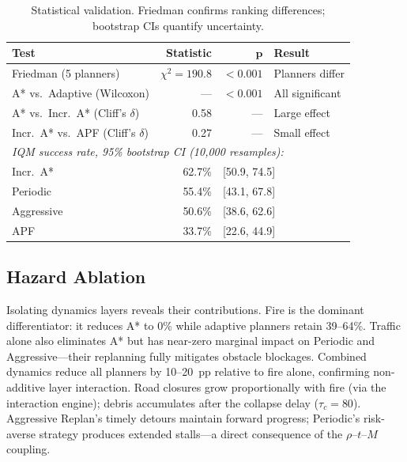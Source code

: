 \documentclass[drones,article,submit,moreauthors]{Definitions/mdpi}
\begin{document}
\begin{table}[!htb]
\centering
\caption{Statistical validation. Friedman confirms ranking differences;
  bootstrap CIs quantify uncertainty.}
\label{tab:stats_summary}
\begin{tabular}{lrrl}
\toprule
\textbf{Test} & \textbf{Statistic} & $\boldsymbol{p}$ & \textbf{Result} \\
\midrule
Friedman (5 planners) & $\chi^2{=}190.8$ & ${<}0.001$ & Planners differ \\
A* vs.\ Adaptive (Wilcoxon) & --- & ${<}0.001$ & All significant \\
A* vs.\ Incr.\ A* (Cliff's $\delta$) & 0.58 & --- & Large effect \\
Incr.\ A* vs.\ APF (Cliff's $\delta$) & 0.27 & --- & Small effect \\
\midrule
\multicolumn{4}{l}{\textit{IQM success rate, 95\% bootstrap CI (10,000 resamples):}} \\
Incr.\ A* & 62.7\% & \multicolumn{2}{l}{[50.9, 74.5]} \\
Periodic & 55.4\% & \multicolumn{2}{l}{[43.1, 67.8]} \\
Aggressive & 50.6\% & \multicolumn{2}{l}{[38.6, 62.6]} \\
APF & 33.7\% & \multicolumn{2}{l}{[22.6, 44.9]} \\
\bottomrule
\end{tabular}
\end{table}

\subsection{Hazard Ablation}\label{sec:ablation}

Isolating dynamics layers reveals their contributions. Fire is the
dominant differentiator: it reduces A* to 0\% while adaptive planners
retain 39--64\%. Traffic alone also eliminates A* but has near-zero
marginal impact on Periodic and Aggressive---their replanning fully
mitigates obstacle blockages. Combined dynamics reduce all planners by
10--20~pp relative to fire alone, confirming non-additive layer interaction.
Road closures grow proportionally with fire (via the
interaction engine); debris accumulates after the collapse delay
($\tau_c{=}80$). Aggressive Replan's timely detours maintain forward
progress; Periodic's risk-averse strategy produces extended stalls---a
direct consequence of the $\rho$--$t$--$M$ coupling.

\end{document}
